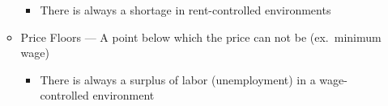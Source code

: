 \documentclass[12pt]{article}
\begin{document}
\begin{enumerate}
\begin{itemize}
        \begin{itemize}

          \item There is always a shortage in rent-controlled environments

        \end{itemize}

      \item Price Floors — A point below which the price can not be (ex.\ minimum wage)

        \begin{itemize}

          \item There is always a surplus of labor (unemployment) in a wage-controlled environment

        \end{itemize}

    \end{itemize}

\end{enumerate}
\end{document}
